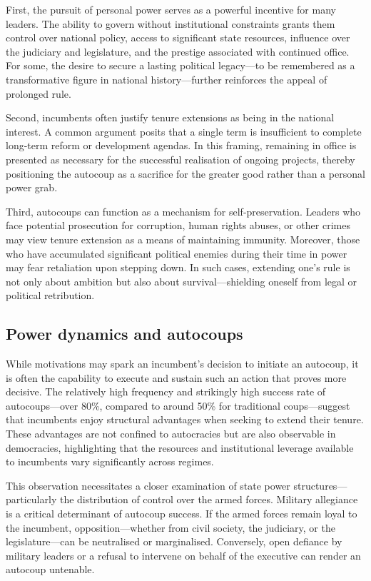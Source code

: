 \documentclass[
  12pt,
]{report}
\begin{document}
First, the pursuit of personal power serves as a powerful incentive for
many leaders. The ability to govern without institutional constraints
grants them control over national policy, access to significant state
resources, influence over the judiciary and legislature, and the
prestige associated with continued office. For some, the desire to
secure a lasting political legacy---to be remembered as a transformative
figure in national history---further reinforces the appeal of prolonged
rule.

Second, incumbents often justify tenure extensions as being in the
national interest. A common argument posits that a single term is
insufficient to complete long-term reform or development agendas. In
this framing, remaining in office is presented as necessary for the
successful realisation of ongoing projects, thereby positioning the
autocoup as a sacrifice for the greater good rather than a personal
power grab.

Third, autocoups can function as a mechanism for self-preservation.
Leaders who face potential prosecution for corruption, human rights
abuses, or other crimes may view tenure extension as a means of
maintaining immunity. Moreover, those who have accumulated significant
political enemies during their time in power may fear retaliation upon
stepping down. In such cases, extending one's rule is not only about
ambition but also about survival---shielding oneself from legal or
political retribution.

\subsection*{Power dynamics and
autocoups}\label{power-dynamics-and-autocoups}

While motivations may spark an incumbent's decision to initiate an
autocoup, it is often the capability to execute and sustain such an
action that proves more decisive. The relatively high frequency and
strikingly high success rate of autocoups---over 80\%, compared to
around 50\% for traditional coups---suggest that incumbents enjoy
structural advantages when seeking to extend their tenure. These
advantages are not confined to autocracies but are also observable in
democracies, highlighting that the resources and institutional leverage
available to incumbents vary significantly across regimes.

This observation necessitates a closer examination of state power
structures---particularly the distribution of control over the armed
forces. Military allegiance is a critical determinant of autocoup
success. If the armed forces remain loyal to the incumbent,
opposition---whether from civil society, the judiciary, or the
legislature---can be neutralised or marginalised. Conversely, open
defiance by military leaders or a refusal to intervene on behalf of the
executive can render an autocoup untenable.
\end{document}
